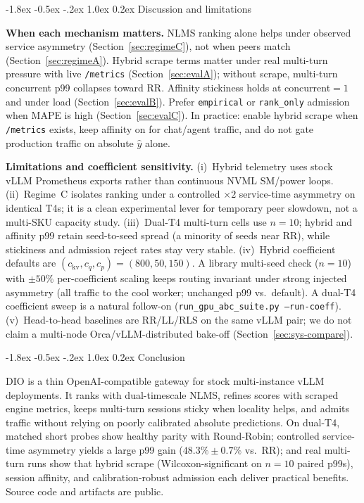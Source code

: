 \documentclass[pdflatex,sn-mathphys-num]{sn-jnl}
\makeatletter
\renewcommand{\section}{\@startsection{section}{1}{\z@}%
  {-1.8ex \@plus -0.5ex \@minus -.2ex}%
  {1.0ex \@plus 0.2ex}%
  {\needspace{4\baselineskip}\normalfont\large\bfseries}}%
\makeatother
\begin{document}
\section{Discussion and limitations}
\label{sec:limitations}

\textbf{When each mechanism matters.}
NLMS ranking alone helps under observed service asymmetry
(Section~\ref{sec:regimeC}), not when peers match (Section~\ref{sec:regimeA}).
Hybrid scrape terms matter under real multi-turn pressure with live
\texttt{/metrics} (Section~\ref{sec:evalA}); without scrape, multi-turn concurrent
p99 collapses toward RR. Affinity stickiness holds at concurrent$=1$ and under load
(Section~\ref{sec:evalB}). Prefer \texttt{empirical} or \texttt{rank\_only}
admission when MAPE is high (Section~\ref{sec:evalC}). In practice: enable hybrid
scrape when \texttt{/metrics} exists, keep affinity on for chat/agent traffic, and
do not gate production traffic on absolute $\hat{y}$ alone.

\textbf{Limitations and coefficient sensitivity.}
\label{sec:coeff-sens}
(i)~Hybrid telemetry uses stock vLLM Prometheus exports rather than continuous NVML
SM/power loops. (ii)~Regime~C isolates ranking under a controlled $\times 2$
service-time asymmetry on identical T4s; it is a clean experimental lever for
temporary peer slowdown, not a multi-SKU capacity study. (iii)~Dual-T4 multi-turn
cells use $n{=}10$; hybrid and affinity p99 retain seed-to-seed spread (a minority
of seeds near RR), while stickiness and admission reject rates stay very stable.
(iv)~Hybrid coefficient defaults are $(c_{\mathrm{kv}},c_q,c_p)=(800,50,150)$. A
library multi-seed check ($n{=}10$) with $\pm 50\%$ per-coefficient scaling keeps
routing invariant under strong injected asymmetry (all traffic to the cool worker;
unchanged p99 vs.\ default). A dual-T4 coefficient sweep is a natural follow-on
(\texttt{run\_gpu\_abc\_suite.py --run-coeff}).
(v)~Head-to-head baselines are RR/LL/RLS on the same vLLM pair; we do not claim a
multi-node Orca/vLLM-distributed bake-off (Section~\ref{sec:sys-compare}).

\section{Conclusion}
\label{sec:conclusion}

DIO is a thin OpenAI-compatible gateway for stock multi-instance vLLM deployments.
It ranks with dual-timescale NLMS, refines scores with scraped engine metrics, keeps
multi-turn sessions sticky when locality helps, and admits traffic without relying
on poorly calibrated absolute predictions. On dual-T4, matched short probes show
healthy parity with Round-Robin; controlled service-time asymmetry yields a large
p99 gain ($48.3\%\pm0.7\%$ vs.\ RR); and real multi-turn runs show that hybrid scrape
(Wilcoxon-significant on $n{=}10$ paired p99s), session affinity, and
calibration-robust admission
each deliver practical benefits. Source code and artifacts are public.
\end{document}
